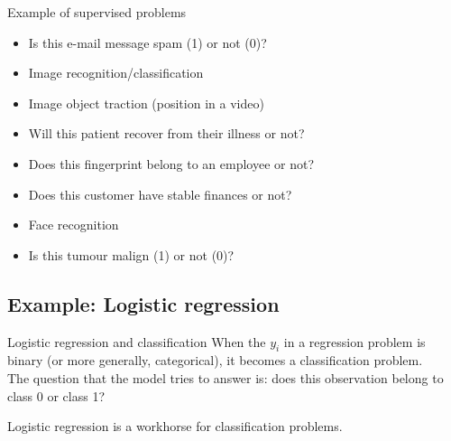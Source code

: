 \documentclass[10pt]{beamer}
\begin{document}
\begin{frame}{Example of supervised problems}



\pause

\begin{itemize}
\item Is this e-mail message spam (1) or not (0)?\pause
\item Image recognition/classification\pause
\item Image object traction (position in a video)\pause
\item Will this patient recover from their illness or not?\pause
\item Does this fingerprint belong to an employee or not?\pause
\item Does this customer have stable finances or not?\pause
\item Face recognition\pause
\item Is this tumour malign (1) or not (0)?\pause
\end{itemize}

\end{frame}

\subsection{Example: Logistic regression}

\begin{frame}{Logistic regression and classification}
When the $y_i$ in a regression problem is binary (or more generally, categorical), it becomes a {\color{uured}classification problem}.\\[3mm]\pause
The question that the model tries to answer is: does this observation belong to class 0 or class 1?\\[3mm]\pause

Logistic regression is a workhorse for classification problems.

\end{frame}
\end{document}
